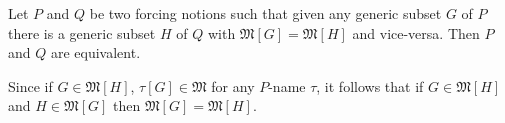 \documentclass[12pt]{article}
\begin{document}
Let $P$ and $Q$ be two forcing notions such that given any generic subset $G$ of $P$ there is a generic subset $H$ of $Q$ with $\mathfrak{M}[G]=\mathfrak{M}[H]$ and vice-versa.  Then $P$ and $Q$ are equivalent.

Since if $G\in\mathfrak{M}[H]$, $\tau[G]\in\mathfrak{M}$ for any $P$-name $\tau$, it follows that if $G\in\mathfrak{M}[H]$ and $H\in\mathfrak{M}[G]$ then $\mathfrak{M}[G]=\mathfrak{M}[H]$.
\end{document}
